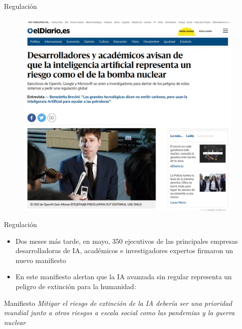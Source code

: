 \documentclass[11pt,aspectratio=169]{beamer}
\begin{document}
\begin{frame}{Regulación}
    \begin{figure}
        \centering
        \href{https://www.eldiario.es/tecnologia/creadores-inteligencias-artificiales-academicos-piden-equiparar-riesgos-bomba-nuclear_1_10253632.html}{\includegraphics[scale=0.35]{img/RiesgoIAmayo2023.png}}
    \end{figure}
\end{frame}

\begin{frame}{Regulación}
    \begin{itemize}
        \item Dos meses más tarde, en mayo, 350 ejecutivos de las principales empresas 
            desarrolladoras de IA, académicos e investigadores expertos firmaron un nuevo 
            manifiesto \pause
        \item En este manifiesto alertan que la IA avanzada sin regular representa un peligro de 
            extinción para la humanidad: \pause
    \end{itemize}
    \begin{block}{Manifiesto}
        \textit{Mitigar el riesgo de extinción de la IA debería ser una prioridad mundial junto a otros riesgos a escala social como las pandemias y la guerra nuclear}
    \end{block}
\end{frame}
\end{document}
